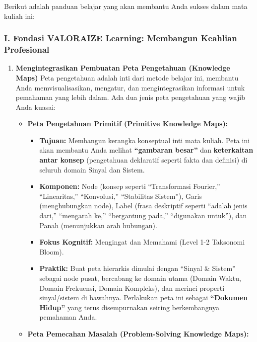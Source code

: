 \documentclass[
  letterpaper,
  DIV=11,
  numbers=noendperiod]{scrreprt}
\providecommand{\tightlist}{%
  \setlength{\itemsep}{0pt}\setlength{\parskip}{0pt}}
\begin{document}
Berikut adalah panduan belajar yang akan membantu Anda sukses dalam mata
kuliah ini:

\subsubsection*{\texorpdfstring{\textbf{I. Fondasi VALORAIZE Learning:
Membangun Keahlian
Profesional}}{I. Fondasi VALORAIZE Learning: Membangun Keahlian Profesional}}\label{i.-fondasi-valoraize-learning-membangun-keahlian-profesional}

\begin{enumerate}
\def\labelenumi{\arabic{enumi}.}
\item
  \textbf{Mengintegrasikan Pembuatan Peta Pengetahuan (Knowledge Maps)}
  Peta pengetahuan adalah inti dari metode belajar ini, membantu Anda
  memvisualisasikan, mengatur, dan mengintegrasikan informasi untuk
  pemahaman yang lebih dalam. Ada dua jenis peta pengetahuan yang wajib
  Anda kuasai:

  \begin{itemize}
  \tightlist
  \item
    \textbf{Peta Pengetahuan Primitif (Primitive Knowledge Maps):}

    \begin{itemize}
    \tightlist
    \item
      \textbf{Tujuan:} Membangun kerangka konseptual inti mata kuliah.
      Peta ini akan membantu Anda melihat \textbf{``gambaran besar''}
      dan \textbf{keterkaitan antar konsep} (pengetahuan deklaratif
      seperti fakta dan definisi) di seluruh domain Sinyal dan Sistem.
    \item
      \textbf{Komponen:} Node (konsep seperti ``Transformasi Fourier,''
      ``Linearitas,'' ``Konvolusi,'' ``Stabilitas Sistem''), Garis
      (menghubungkan node), Label (frasa deskriptif seperti ``adalah
      jenis dari,'' ``mengarah ke,'' ``bergantung pada,'' ``digunakan
      untuk''), dan Panah (menunjukkan arah hubungan).
    \item
      \textbf{Fokus Kognitif:} Mengingat dan Memahami (Level 1-2
      Taksonomi Bloom).
    \item
      \textbf{Praktik:} Buat peta hierarkis dimulai dengan ``Sinyal \&
      Sistem'' sebagai node pusat, bercabang ke domain utama (Domain
      Waktu, Domain Frekuensi, Domain Kompleks), dan merinci properti
      sinyal/sistem di bawahnya. Perlakukan peta ini sebagai
      \textbf{``Dokumen Hidup''} yang terus disempurnakan seiring
      berkembangnya pemahaman Anda.
    \end{itemize}
  \item
    \textbf{Peta Pemecahan Masalah (Problem-Solving Knowledge Maps):}


\end{itemize}
\end{enumerate}
\end{document}
